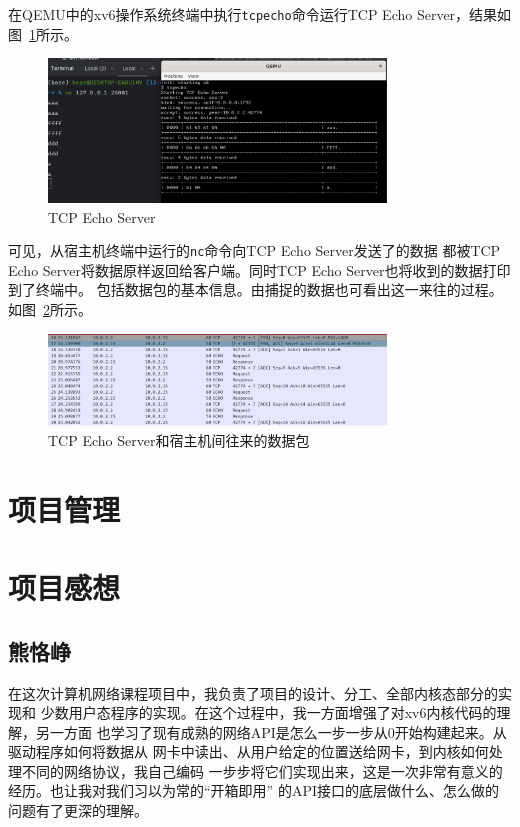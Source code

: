 \documentclass[a4paper,twoside]{ctexrep}
\begin{document}
\begin{spacing}{1.2}
在QEMU中的xv6操作系统终端中执行\texttt{tcpecho}命令运行TCP Echo Server，结果如图~\ref{fig:tcpecho}所示。
\begin{figure}[htb]
	\centering
	\caption{TCP Echo Server}
	\label{fig:tcpecho}
	\includegraphics[width=0.8\textwidth]{tcpecho.png}
\end{figure}
可见，从宿主机终端中运行的\texttt{nc}命令向TCP Echo Server发送了的数据
都被TCP Echo Server将数据原样返回给客户端。同时TCP Echo Server也将收到的数据打印到了终端中。
包括数据包的基本信息。由捕捉的数据也可看出这一来往的过程。如图~\ref{fig:tcpechopack}所示。
\begin{figure}[htb]
	\centering
	\caption{TCP Echo Server和宿主机间往来的数据包}
	\label{fig:tcpechopack}
	\includegraphics[width=0.8\textwidth]{tcpechopack.png}
\end{figure}



\chapter{项目管理}

\chapter{项目感想}

\section{熊恪峥}

在这次计算机网络课程项目中，我负责了项目的设计、分工、全部内核态部分的实现和
少数用户态程序的实现。在这个过程中，我一方面增强了对xv6内核代码的理解，另一方面
也学习了现有成熟的网络API是怎么一步一步从0开始构建起来。从驱动程序如何将数据从
网卡中读出、从用户给定的位置送给网卡，到内核如何处理不同的网络协议，我自己编码
一步步将它们实现出来，这是一次非常有意义的经历。也让我对我们习以为常的“开箱即用”
的API接口的底层做什么、怎么做的问题有了更深的理解。


\end{spacing}
\end{document}
